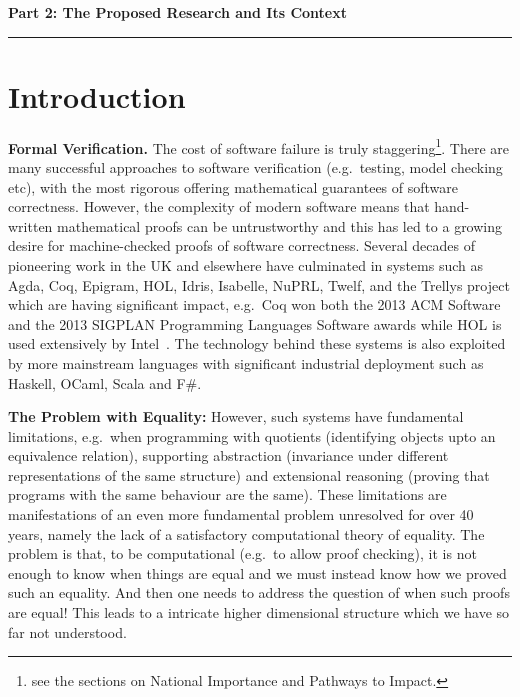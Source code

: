 \documentclass[a4paper,11pt]{article}
\newcommand{\eg}{{e.g.}\ }
\begin{document}
\newpage
\noindent
{\bf \Large Part 2: The Proposed Research and Its Context}

\vspace*{-0.23in}

\begin{center}
\rule{170mm}{.5mm}
\end{center}

\vspace*{-0.4in}

\section{Introduction}\label{sec:intro}

\vspace*{-0.1in}

{\bf Formal Verification.} The cost of software failure is truly
staggering\footnote{see the sections on National Importance and
  Pathways to Impact.}. There are many successful approaches to
software verification (\eg testing, model checking etc), with the most
rigorous offering mathematical guarantees of software
correctness. However, the complexity of modern software means that
hand-written mathematical proofs can be untrustworthy and this has led
to a growing desire for machine-checked proofs of software
correctness. Several decades of pioneering work in the UK and
elsewhere have culminated in systems such as Agda, Coq, Epigram, HOL,
Idris, Isabelle, NuPRL, Twelf, and the Trellys project which are
having significant impact, \eg Coq won both the 2013 ACM Software and
the 2013 SIGPLAN Programming Languages Software awards while HOL is
used extensively by Intel~\cite{harrison:sfm}. The technology behind
these systems is also exploited by more mainstream languages with
significant industrial deployment such as Haskell, OCaml, Scala and
F\#. 

{\bf The Problem with Equality:} However, such systems have
fundamental limitations, \eg when programming with quotients
(identifying objects upto an equivalence relation), supporting
abstraction (invariance under different representations of the same
structure) and extensional reasoning (proving that programs with the same
behaviour are the same). These limitations are manifestations of
an even more fundamental problem unresolved for over 40
years, namely the lack of a satisfactory computational theory of
equality. The problem is that, to be computational (\eg to allow proof
checking), it is not enough to know when things are equal and we must
instead know how we proved such an equality. And then one needs to
address the question of when such proofs are equal! This leads to a
intricate higher dimensional structure which we have so far not
understood.
\end{document}
